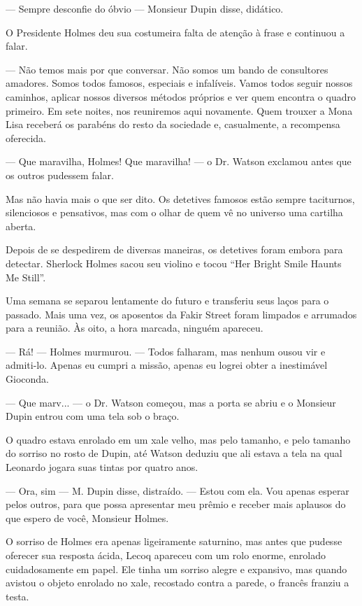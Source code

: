 --- Sempre desconfie do óbvio --- Monsieur Dupin disse, didático.

O Presidente Holmes deu sua costumeira falta de atenção à frase e
continuou a falar.

--- Não temos mais por que conversar. Não somos um bando de consultores
amadores. Somos todos famosos, especiais e infalíveis. Vamos todos
seguir nossos caminhos, aplicar nossos diversos métodos próprios e ver
quem encontra o quadro primeiro. Em sete noites, nos reuniremos aqui
novamente. Quem trouxer a Mona Lisa receberá os parabéns do resto da
sociedade e, casualmente, a recompensa oferecida.

--- Que maravilha, Holmes! Que maravilha! --- o Dr. Watson exclamou
antes que os outros pudessem falar.

Mas não havia mais o que ser dito. Os detetives famosos estão sempre
taciturnos, silenciosos e pensativos, mas com o olhar de quem vê no
universo uma cartilha aberta.

Depois de se despedirem de diversas maneiras, os detetives foram embora
para detectar. Sherlock Holmes sacou seu violino e tocou ``Her Bright
Smile Haunts Me Still''.

Uma semana se separou lentamente do futuro e transferiu seus laços para
o passado. Mais uma vez, os aposentos da Fakir Street foram limpados e
arrumados para a reunião. Às oito, a hora marcada, ninguém apareceu.

--- Rá! --- Holmes murmurou. --- Todos falharam, mas nenhum ousou vir e
admiti-lo. Apenas eu cumpri a missão, apenas eu logrei obter a
inestimável Gioconda.

--- Que marv... --- o Dr. Watson começou, mas a porta se abriu e o
Monsieur Dupin entrou com uma tela sob o braço.

O quadro estava enrolado em um xale velho, mas pelo tamanho, e pelo
tamanho do sorriso no rosto de Dupin, até Watson deduziu que ali estava
a tela na qual Leonardo jogara suas tintas por quatro anos.

--- Ora, sim --- M. Dupin disse, distraído. --- Estou com ela. Vou
apenas esperar pelos outros, para que possa apresentar meu prêmio e
receber mais aplausos do que espero de você, Monsieur Holmes.

O sorriso de Holmes era apenas ligeiramente saturnino, mas antes que
pudesse oferecer sua resposta ácida, Lecoq apareceu com um rolo enorme,
enrolado cuidadosamente em papel. Ele tinha um sorriso alegre e
expansivo, mas quando avistou o objeto enrolado no xale, recostado
contra a parede, o francês franziu a testa.

